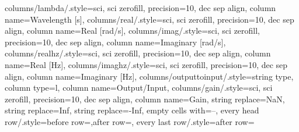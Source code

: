 {columns/lambda/.style={sci, sci zerofill, precision=10, dec sep align, column name={Wavelength [s]}},
columns/real/.style={sci, sci zerofill, precision=10, dec sep align, column name={Real [rad/s]}},
columns/imag/.style={sci, sci zerofill, precision=10, dec sep align, column name={Imaginary [rad/s]}},
columns/realhz/.style={sci, sci zerofill, precision=10, dec sep align, column name={Real [Hz]}},
columns/imaghz/.style={sci, sci zerofill, precision=10, dec sep align, column name={Imaginary [Hz]}},
columns/outputtoinput/.style={string type, column type=l, column name={Output/Input}},
columns/gain/.style={sci, sci zerofill, precision=10, dec sep align, column name={Gain}},
string replace={NaN}{},
string replace={Inf}{},
string replace={-Inf}{},
empty cells with={--},
every head row/.style={before row=\toprule,after row=\midrule},
every last row/.style={after row=\bottomrule}}
